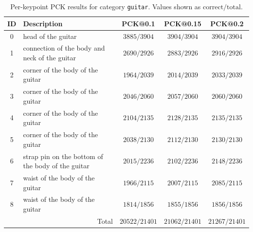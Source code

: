 \begin{table}[h]
\centering
\small
\caption{Per-keypoint PCK results for category \texttt{guitar}. Values shown as $\text{correct}/\text{total}$.}
\label{tab:pck_guitar}
\begin{tabular}{cl ccc}
\toprule
ID & Description & PCK@0.1 & PCK@0.15 & PCK@0.2 \\
\midrule
0 & head of the guitar & $3885/3904$ & $3904/3904$ & $3904/3904$ \\
1 & connection of the body and neck of the guitar & $2690/2926$ & $2883/2926$ & $2916/2926$ \\
2 & corner of the body of the guitar & $1964/2039$ & $2014/2039$ & $2033/2039$ \\
3 & corner of the body of the guitar & $2046/2060$ & $2057/2060$ & $2060/2060$ \\
4 & corner of the body of the guitar & $2104/2135$ & $2128/2135$ & $2135/2135$ \\
5 & corner of the body of the guitar & $2038/2130$ & $2112/2130$ & $2130/2130$ \\
6 & strap pin on the bottom of the body of the guitar & $2015/2236$ & $2102/2236$ & $2148/2236$ \\
7 & waist of the body of the guitar & $1966/2115$ & $2007/2115$ & $2085/2115$ \\
8 & waist of the body of the guitar & $1814/1856$ & $1855/1856$ & $1856/1856$ \\
\midrule
\multicolumn{2}{r}{Total} & $20522/21401$ & $21062/21401$ & $21267/21401$ \\
\bottomrule
\end{tabular}
\end{table}

